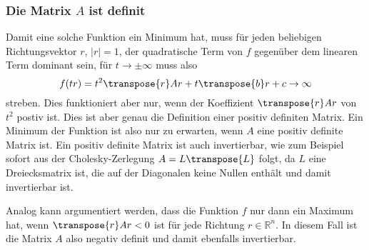 \subsubsection{Die Matrix $A$ ist definit}
Damit eine solche Funktion ein Minimum hat, muss für jeden beliebigen
Richtungsvektor $r$, $|r|=1$, der quadratische Term von $f$ gegenüber dem
linearen Term dominant sein, für $t\to\pm\infty$ muss also
\[
f(tr)
=
t^2
\transpose{r}Ar
+
t
\transpose{b}r
+
c
\to \infty
\]
streben.
Dies funktioniert aber nur, wenn der Koeffizient $\transpose{r}Ar$ von
$t^2$ postiv ist.
Dies ist aber genau die Definition einer positiv definiten Matrix.
Ein Minimum der Funktion ist also nur zu erwarten, wenn $A$ eine positiv
definite Matrix ist.
Ein positiv definite Matrix ist auch invertierbar, wie zum Beispiel
sofort aus der Cholesky-Zerlegung $A=L\transpose{L}$ folgt, da $L$
eine Dreiecksmatrix ist, die auf der Diagonalen keine Nullen enthält
und damit invertierbar ist.

Analog kann argumentiert werden, dass die Funktion $f$ nur dann
ein Maximum hat, wenn $\transpose{r}Ar<0$ ist für jede Richtung
$r\in\mathbb{R}^n$.
In diesem Fall ist die Matrix $A$ also negativ definit und damit
ebenfalls invertierbar.


%
%
